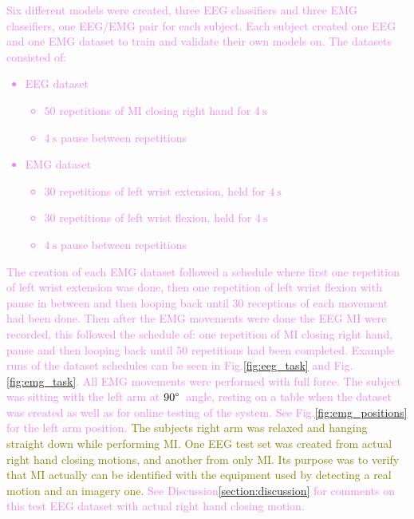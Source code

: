 \textcolor{violet}{Six different models were created, three EEG classifiers and three EMG classifiers, one EEG/EMG pair for each subject. Each subject created one EEG and one EMG dataset to train and validate their own models on. The datasets consisted of:
	\begin{itemize}
		\item EEG dataset
		      \begin{itemize}
			      \item $50$ repetitions of MI closing right hand for $4\:\text{s}$
			      \item $4\:\text{s}$ pause between repetitions
		      \end{itemize}
		\item EMG dataset
		      \begin{itemize}
			      \item $30$ repetitions of left wrist extension, held for $4\:\text{s}$
			      \item $30$ repetitions of left wrist flexion, held for $4\:\text{s}$
			      \item $4\:\text{s}$ pause between repetitions
		      \end{itemize}
	\end{itemize}}
\textcolor{violet}{The creation of each EMG dataset followed a schedule where first one repetition of left wrist extension was done, then one repetition of left wrist flexion with pause in between and then looping back until $30$ receptions of each movement had been done. Then after the EMG movements were done the EEG MI were recorded, this followed the schedule of: one repetition of MI closing right hand, pause and then looping back until $50$ repetitions had been completed. Example runs of the dataset schedules can be seen in Fig.\:\ref{fig:eeg_task} and Fig.\:\ref{fig:emg_task}.}
\textcolor{violet}{All EMG movements were performed with full force.}
\textcolor{violet}{The subject was sitting with the left arm at $90\degree\:$ angle, resting on a table when the dataset was created as well as for online testing of the system. See Fig.\:\ref{fig:emg_positions} for the left arm position.}
\textcolor{olive}{The subjects right arm was relaxed and hanging straight down while performing MI.}
\textcolor{olive}{One EEG test set was created from actual right hand closing motions, and another from only MI. Its purpose was to verify that MI actually can be identified with the equipment used by detecting a real motion and an imagery one.}
\textcolor{violet}{See Discussion\:\ref{section:discussion} for comments on this test EEG dataset with actual right hand closing motion.}
